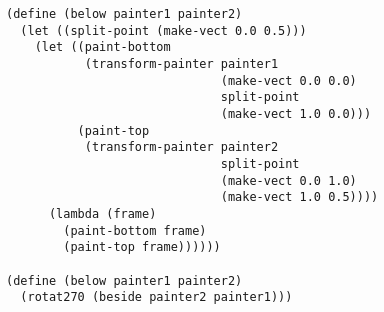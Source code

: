 \documentclass[a4paper,12pt]{article}
\begin{document}
\begin{lstlisting}
(define (below painter1 painter2)
  (let ((split-point (make-vect 0.0 0.5)))
    (let ((paint-bottom
           (transform-painter painter1
                              (make-vect 0.0 0.0)
                              split-point
                              (make-vect 1.0 0.0)))
          (paint-top
           (transform-painter painter2
                              split-point
                              (make-vect 0.0 1.0)
                              (make-vect 1.0 0.5))))
      (lambda (frame)
        (paint-bottom frame)
        (paint-top frame))))))

(define (below painter1 painter2)
  (rotat270 (beside painter2 painter1)))
\end{lstlisting}
\end{document}
